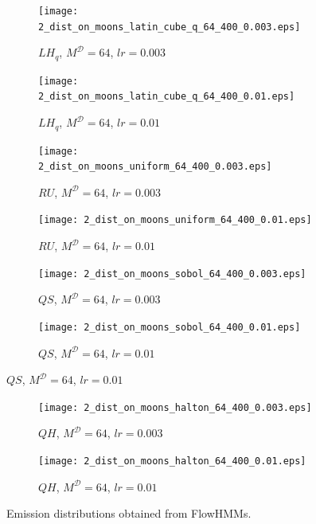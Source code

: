 \documentclass[shortabstract]{iithesis}
\begin{document}
\begin{figure}[!ht]\ContinuedFloat
    \begin{subfigure}{0.45\textwidth}
        \texttt{[image: 2\_dist\_on\_moons\_latin\_cube\_q\_64\_400\_0.003.eps]}
        \caption{$LH_q$, $M^{\mathcal D} = 64$, $lr = 0.003$ }
    \end{subfigure}
    \begin{subfigure}{0.45\textwidth}
        \texttt{[image: 2\_dist\_on\_moons\_latin\_cube\_q\_64\_400\_0.01.eps]}
        \caption{$LH_q$, $M^{\mathcal D} = 64$, $lr = 0.01$ }
    \end{subfigure}

    \begin{subfigure}{0.45\textwidth}
        \texttt{[image: 2\_dist\_on\_moons\_uniform\_64\_400\_0.003.eps]}
        \caption{$RU$, $M^{\mathcal D} = 64$, $lr = 0.003$ }
    \end{subfigure}
    \begin{subfigure}{0.45\textwidth}
        \texttt{[image: 2\_dist\_on\_moons\_uniform\_64\_400\_0.01.eps]}
        \caption{$RU$, $M^{\mathcal D} = 64$, $lr = 0.01$ }
    \end{subfigure}

    \begin{subfigure}{0.45\textwidth} 
        \texttt{[image: 2\_dist\_on\_moons\_sobol\_64\_400\_0.003.eps]}
        \caption{$QS$, $M^{\mathcal D} = 64$, $lr = 0.003$ }
    \end{subfigure}
    \begin{subfigure}{0.45\textwidth}
        \texttt{[image: 2\_dist\_on\_moons\_sobol\_64\_400\_0.01.eps]}
        \caption{$QS$, $M^{\mathcal D} = 64$, $lr = 0.01$ }
    \end{subfigure}
\end{figure} 

\pagebreak

\begin{figure}[!ht]\ContinuedFloat
    \centering
    \begin{subfigure}{0.45\textwidth}
        \texttt{[image: 2\_dist\_on\_moons\_halton\_64\_400\_0.003.eps]}
        \caption{$QH$, $M^{\mathcal D} = 64$, $lr = 0.003$ }
    \end{subfigure}
    \begin{subfigure}{0.45\textwidth}
        \texttt{[image: 2\_dist\_on\_moons\_halton\_64\_400\_0.01.eps]}
        \caption{$QH$, $M^{\mathcal D} = 64$, $lr = 0.01$ }
    \end{subfigure}
    \caption{Emission distributions obtained from FlowHMMs.}
    \label{fig:ex3_flows_dist}
\end{figure}
\end{document}
